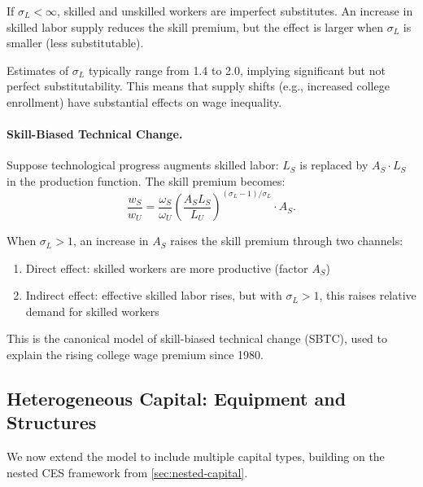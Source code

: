 \begin{calloutimportant}
If $\sigma_L < \infty$, skilled and unskilled workers are imperfect substitutes. An increase in skilled labor supply reduces the skill premium, but the effect is larger when $\sigma_L$ is smaller (less substitutable).

Estimates of $\sigma_L$ typically range from 1.4 to 2.0, implying significant but not perfect substitutability. This means that supply shifts (e.g., increased college enrollment) have substantial effects on wage inequality.
\end{calloutimportant}

\paragraph{Skill-Biased Technical Change.}
Suppose technological progress augments skilled labor: $L_S$ is replaced by $A_S \cdot L_S$ in the production function. The skill premium becomes:
\begin{equation}
\frac{w_S}{w_U} = \frac{\omega_S}{\omega_U} \left( \frac{A_S L_S}{L_U} \right)^{(\sigma_L - 1)/\sigma_L} \cdot A_S.
\label{eq:skill-premium-sbtc}
\end{equation}

When $\sigma_L > 1$, an increase in $A_S$ raises the skill premium through two channels:
\begin{enumerate}[nosep]
\item Direct effect: skilled workers are more productive (factor $A_S$)
\item Indirect effect: effective skilled labor rises, but with $\sigma_L > 1$, this raises relative demand for skilled workers
\end{enumerate}

This is the canonical model of skill-biased technical change (SBTC), used to explain the rising college wage premium since 1980.

\subsection{Heterogeneous Capital: Equipment and Structures}
\label{subsec:heterogeneous-capital}

We now extend the model to include multiple capital types, building on the nested CES framework from \cref{sec:nested-capital}.

